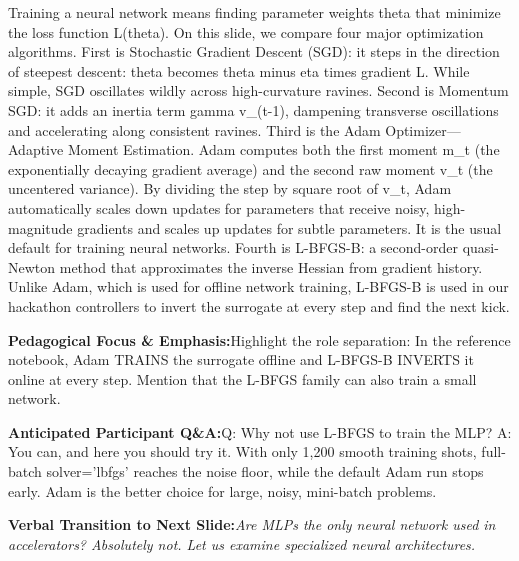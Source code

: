 \documentclass[11pt,a4paper]{article}
\begin{document}
\begin{tcolorbox}[colback=white,colframe=primaryblue,title={\footnotesize\bfseries\color{white}Spoken Presenter Script},fontupper=\small,left=6pt,right=6pt,top=3pt,bottom=3pt,boxrule=0.8pt,arc=2.5pt]
Training a neural network means finding parameter weights theta that minimize the loss function L(theta). On this slide, we compare four major optimization algorithms. First is Stochastic Gradient Descent (SGD): it steps in the direction of steepest descent: theta becomes theta minus eta times gradient L. While simple, SGD oscillates wildly across high-curvature ravines. Second is Momentum SGD: it adds an inertia term gamma v\_(t-1), dampening transverse oscillations and accelerating along consistent ravines. Third is the Adam Optimizer—Adaptive Moment Estimation. Adam computes both the first moment m\_t (the exponentially decaying gradient average) and the second raw moment v\_t (the uncentered variance). By dividing the step by square root of v\_t, Adam automatically scales down updates for parameters that receive noisy, high-magnitude gradients and scales up updates for subtle parameters. It is the usual default for training neural networks. Fourth is L-BFGS-B: a second-order quasi-Newton method that approximates the inverse Hessian from gradient history. Unlike Adam, which is used for offline network training, L-BFGS-B is used in our hackathon controllers to invert the surrogate at every step and find the next kick.
\end{tcolorbox}
\vspace{0.2em}
\begin{tcolorbox}[colback=lightbg,colframe=bordergray,left=6pt,right=6pt,top=3pt,bottom=3pt,boxrule=0.6pt,arc=2.5pt]
\small
\noindent\textbf{\color{navy}Pedagogical Focus \& Emphasis:}\enspace Highlight the role separation: In the reference notebook, Adam TRAINS the surrogate offline and L-BFGS-B INVERTS it online at every step. Mention that the L-BFGS family can also train a small network.\par\vspace{0.3em}
\noindent\textbf{\color{successgreen}Anticipated Participant Q\&A:}\enspace Q: Why not use L-BFGS to train the MLP? A: You can, and here you should try it. With only 1,200 smooth training shots, full-batch solver='lbfgs' reaches the noise floor, while the default Adam run stops early. Adam is the better choice for large, noisy, mini-batch problems.\par\vspace{0.3em}
\noindent\textbf{\color{accent}Verbal Transition to Next Slide:}\enspace \emph{Are MLPs the only neural network used in accelerators? Absolutely not. Let us examine specialized neural architectures.}
\end{tcolorbox}
\end{document}
